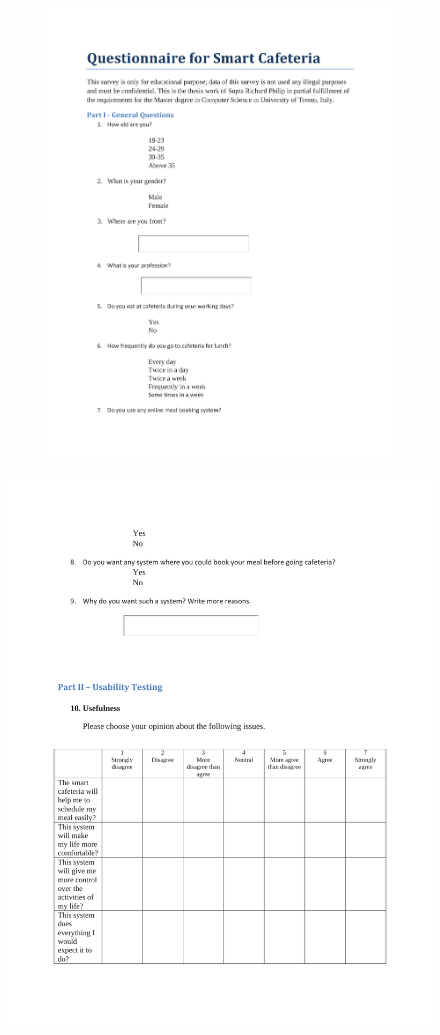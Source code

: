 \begin{appendices}
\begin{figure}[h!t]
    \centering
      \includegraphics[height=4.7in, width=6in]{ch5/UsabilityQuestionnaire1.pdf}
  \label{UsabilityQuestionnaire1}
  
\end{figure}


\begin{figure}[h!t]
    \centering
      \includegraphics[width=6in]{ch5/UsabilityQuestionnaire2.pdf}
  \label{UsabilityQuestionnaire2}
\end{figure}



\end{appendices}

